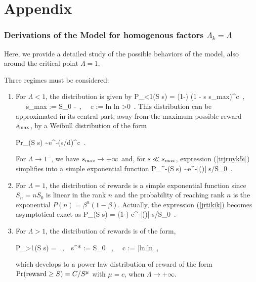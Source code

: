\section*{Appendix}



\subsubsection{Derivations of the Model for homogenous factors $\Lambda_k = \Lambda$}
\label{derivation}
Here, we provide a detailed study of the possible behaviors of the model, also around the critical point $\Lambda =1$.

Three regimes must be considered:
\begin{enumerate}
\item For $\Lambda < 1$, the distribution is given by
\be
P_{\Lambda <1}(S  \geq s) = (1-\beta) \left(1 - {s \over s_{\rm max}}\right)^c~, ~~~s_{\rm max} := {S_0 \Lambda {}-\Lambda}~, ~~c := {\rm{ln}{\beta} 
\over \rm{ln}{\Lambda}} >0~.
\label{trjruyk5i}
\ee
This distribution can be approximated in its central part, away from the maximum possible reward $s_{\rm max}$,
by a Weibull distribution of the form

\be
{\rm Pr}_{\rm }({\rm S} \geq s) \sim e^{-(s/d)^{c}}~.
\label{trjeargquju}
\ee

For $\Lambda \to 1^-$, 
we have $s_{\rm max} \to +\infty$ and, for $s \ll s_{\rm max}$,
expression (\ref{trjruyk5i}) simplifies into a simple exponential function 
\be
P_{\Lambda {}^-}(S  \geq s) \sim e^{-|\ln(\beta)| s/S_0}~.
\label{jrtikik}
\ee

\item For $\Lambda = 1$, the distribution of rewards  is a simple exponential function since $S_{n} = n S_{0}$ is linear in the rank $n$ and the probability of reaching rank $n$ is the exponential
$P(n) = \beta^{n} (1-\beta)$. Actually, the expression
(\ref{jrtikik}) becomes asymptotical exact as
\be
P_{}(S  \geq s) = (1-\beta) e^{-|\ln(\beta)| s/S_0}~.
\label{jrtikik}
\ee


\item For $\Lambda > 1$, the distribution of rewards is of the form,

\be
P_{\Lambda >1}(S  \geq s) = ~,~~s^{*} := {S_0 \Lambda \over {}}~, ~~c := {|\rm{ln}{\beta}|\over \rm{ln}{\Lambda}}~,
\label{jrtisdfjl}
\ee

which develops to a power law distribution of reward of the form
${\rm Pr}({\rm reward} \geq S) = C/S^{\mu}$ with $\mu = c$, when $\Lambda \rightarrow +\infty$.

\end{enumerate}